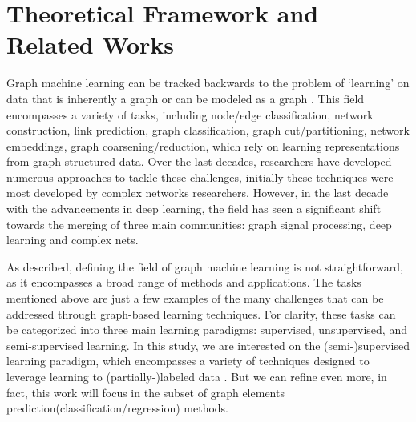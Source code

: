 \chapter[Theoretical Framework]{Theoretical Framework and Related Works}
\label{TheoreticalFramework}

Graph machine learning can be tracked backwards to the problem of `learning' on data that is inherently a graph \cite{silva2016machine, JMLR:Perozzi} or can be modeled as a graph \cite{verri2013,grape2020}. This field encompasses a variety of tasks, including node/edge classification, network construction, link prediction, graph classification, graph cut/partitioning, network embeddings, graph coarsening/reduction, which rely on learning representations from graph-structured data. Over the last decades, researchers have developed numerous approaches to tackle these challenges, initially these techniques were most developed by complex networks researchers. However, in the last decade with the advancements in deep learning, the field has seen a significant shift towards the merging of three main communities: graph signal processing, deep learning and complex nets.

As described, defining the field of graph machine learning is not straightforward, as it encompasses a broad range of methods and applications. The tasks mentioned above are just a few examples of the many challenges that can be addressed through graph-based learning techniques. For clarity, these tasks can be categorized into three main learning paradigms: supervised, unsupervised, and semi-supervised learning. In this study, we are interested on the (semi-)supervised learning paradigm, which encompasses a variety of techniques designed to leverage learning to (partially-)labeled data \cite{verri2018advantages,amanciof}. But we can refine even more, in fact, this work will focus in the subset of graph elements prediction(classification/regression) methods.

